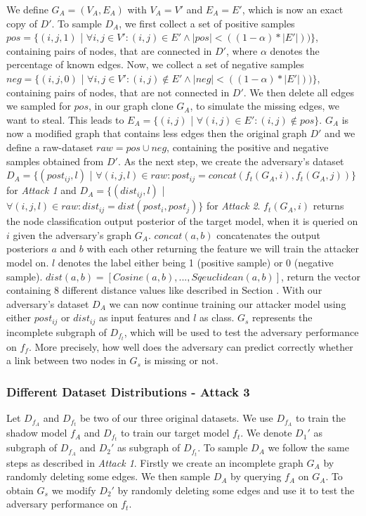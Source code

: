         We define $G_A = (V_A, E_A)$ with $V_A = V'$ and $E_A = E'$, which is now an exact copy of $D'$.
        To sample $D_A$, we first collect a set of positive samples $pos = \{(i,j, 1)$ | $\forall i,j \in V': (i,j) \in E' \wedge |pos| < ((1 - \alpha) * |E'|))\}$, containing pairs of nodes, that are connected in $D'$, where $\alpha$ denotes the percentage of known edges.
        Now, we collect a set of negative samples $neg = \{(i,j, 0)$ | $\forall i,j \in V': (i,j) \not\in E' \wedge |neg| < ((1 - \alpha) * |E'|))\}$, containing pairs of nodes, that are not connected in $D'$.
        We then delete all edges we sampled for $pos$, in our graph clone $G_A$, to simulate the missing edges, we want to steal.
        This leads to $E_A = \{(i,j)$ | $\forall (i,j) \in E': (i,j) \not\in pos\}$.
        $G_A$ is now a modified graph that contains less edges then the original graph $D'$ and we define a raw-dataset $raw = pos \cup neg$, containing the positive and negative samples obtained from $D'$.
        As the next step, we create the adversary's dataset $D_A = \{(post_{ij}, l)$ | $\forall (i,j,l)\in raw: post_{ij} = concat(f_t(G_A, i), f_t(G_A, j))\}$ for \emph{Attack 1} and $D_A = \{(dist_{ij}, l)$ | $\forall (i,j,l)\in raw: dist_{ij} = dist(post_i, post_j)\}$ for \emph{Attack 2}.
        $f_t(G_A, i)$ returns the node classification output posterior of the target model, when it is queried on $i$ given the adversary's graph $G_A$.
        $concat(a, b)$ concatenates the output posteriors $a$ and $b$ with each other returning the feature we will train the attacker model on.
        $l$ denotes the label either being 1 (positive sample) or 0 (negative sample).
        $dist(a,b) = [Cosine(a,b), ..., Sqeuclidean(a,b)]$, return the vector containing 8 different distance values like described in Section .
        With our adversary's dataset $D_A$ we can now continue training our attacker model using either $post_{ij}$ or $dist_{ij}$ as input features and $l$ as class.
        $G_s$ represents the incomplete subgraph of $D_{f_t}$, which will be used to test the adversary performance on $f_f$.
        More precisely, how well does the adversary can predict correctly whether a link between two nodes in $G_s$ is missing or not.

      \subsubsection*{Different Dataset Distributions - Attack 3}

        Let $D_{f_A}$ and $D_{f_t}$ be two of our three original datasets.
        We use $D_{f_A}$ to train the shadow model $f_A$ and $D_{f_t}$ to train our target model $f_t$.
        We denote $D_1'$ as subgraph of $D_{f_A}$ and $D_2'$ as subgraph of $D_{f_t}$.
        To sample $D_A$ we follow the same steps as described in \emph{Attack 1}.
        Firstly we create an incomplete graph $G_A$ by randomly deleting some edges.
        We then sample $D_A$ by querying $f_A$ on $G_A$.
        To obtain $G_s$ we modify $D_2'$ by randomly deleting some edges and use it to test the adversary performance on $f_t$.

